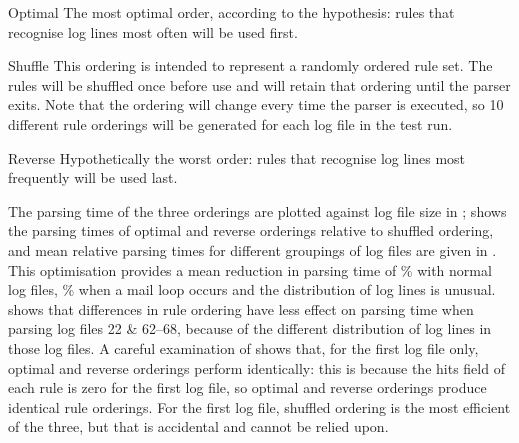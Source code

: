 \begin{boldeqlist}

    \item [Optimal]  The most optimal order, according to the hypothesis:
        rules that recognise log lines most often will be used first.

    \item [Shuffle] This ordering is intended to represent a randomly
        ordered rule set.  The rules will be shuffled once before use and
        will retain that ordering until the parser exits.  Note that the
        ordering will change every time the parser is executed, so 10
        different rule orderings will be generated for each log file in the
        test run.

    \item [Reverse] Hypothetically the worst order: rules that recognise
        log lines most frequently will be used last.

\end{boldeqlist}

The parsing time of the three orderings are plotted against log file size
in ;  shows the parsing
times of optimal and reverse orderings relative to shuffled ordering, and
mean relative parsing times for different groupings of log files are given
in .  This optimisation provides a mean reduction in
parsing time of
\%
with normal log files,
\%
when a mail loop occurs and the distribution of log lines is unusual.
 shows that differences in rule ordering have less
effect on parsing time when parsing log files 22 \& 62--68, because of the
different distribution of log lines in those log files.  A careful
examination of  shows that, for the first log file
only, optimal and reverse orderings perform identically: this is because
the hits field of each rule is zero for the first log file, so optimal and
reverse orderings produce identical rule orderings.  For the first log
file, shuffled ordering is the most efficient of the three, but that is
accidental and cannot be relied upon.

